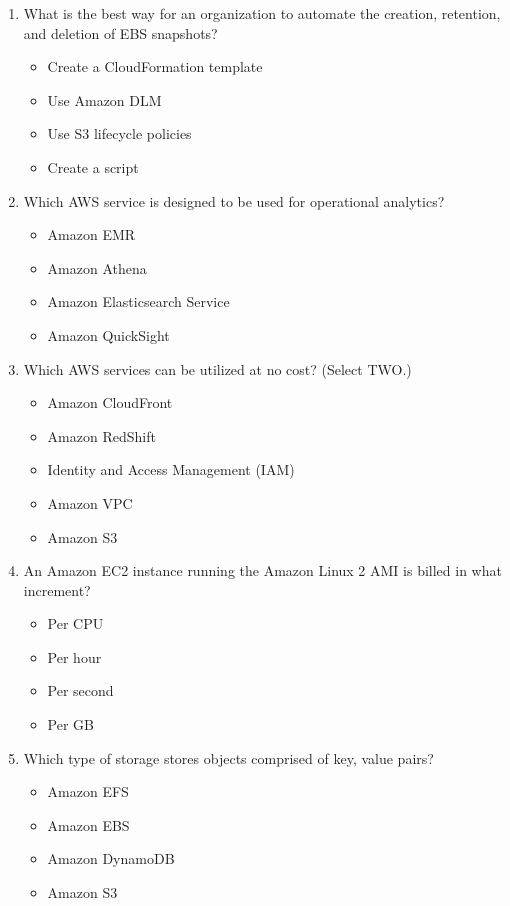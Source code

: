 \begin{enumerate}
	\item What is the best way for an organization to automate the creation, retention, and deletion of EBS snapshots?
	\begin{itemize}
		\item Create a CloudFormation template
		\item Use Amazon DLM
		\item Use S3 lifecycle policies
		\item Create a script
	\end{itemize}

	\item Which AWS service is designed to be used for operational analytics?
	\begin{itemize}
		\item Amazon EMR
		\item Amazon Athena
		\item Amazon Elasticsearch Service
		\item Amazon QuickSight
	\end{itemize}

	\item Which AWS services can be utilized at no cost? (Select TWO.)
	\begin{itemize}
		\item Amazon CloudFront
		\item Amazon RedShift
		\item Identity and Access Management (IAM)
		\item Amazon VPC
		\item Amazon S3
	\end{itemize}

	\item An Amazon EC2 instance running the Amazon Linux 2 AMI is billed in what increment?
	\begin{itemize}
		\item Per CPU
		\item Per hour
		\item Per second
		\item Per GB
	\end{itemize}

	\item Which type of storage stores objects comprised of key, value pairs?
	\begin{itemize}
		\item Amazon EFS
		\item Amazon EBS
		\item Amazon DynamoDB
		\item Amazon S3
	\end{itemize}


\end{enumerate}
